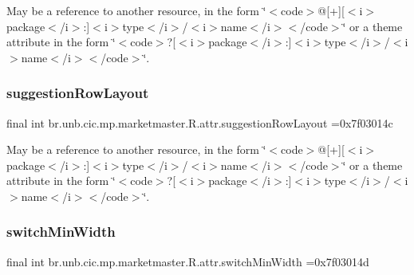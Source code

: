 May be a reference to another resource, in the form \char`\"{}$<$code$>$@\mbox{[}+\mbox{]}\mbox{[}$<$i$>$package$<$/i$>$\+:\mbox{]}$<$i$>$type$<$/i$>$/$<$i$>$name$<$/i$>$$<$/code$>$\char`\"{} or a theme attribute in the form \char`\"{}$<$code$>$?\mbox{[}$<$i$>$package$<$/i$>$\+:\mbox{]}$<$i$>$type$<$/i$>$/$<$i$>$name$<$/i$>$$<$/code$>$\char`\"{}. \mbox{\label{classbr_1_1unb_1_1cic_1_1mp_1_1marketmaster_1_1R_1_1attr_ab55cb82d58c03b036697134199cd8334}} 
\subsubsection{\texorpdfstring{suggestion\+Row\+Layout}{suggestionRowLayout}}
{\footnotesize\ttfamily final int br.\+unb.\+cic.\+mp.\+marketmaster.\+R.\+attr.\+suggestion\+Row\+Layout =0x7f03014c\hspace{0.3cm}{\ttfamily [static]}}

May be a reference to another resource, in the form \char`\"{}$<$code$>$@\mbox{[}+\mbox{]}\mbox{[}$<$i$>$package$<$/i$>$\+:\mbox{]}$<$i$>$type$<$/i$>$/$<$i$>$name$<$/i$>$$<$/code$>$\char`\"{} or a theme attribute in the form \char`\"{}$<$code$>$?\mbox{[}$<$i$>$package$<$/i$>$\+:\mbox{]}$<$i$>$type$<$/i$>$/$<$i$>$name$<$/i$>$$<$/code$>$\char`\"{}. \mbox{\label{classbr_1_1unb_1_1cic_1_1mp_1_1marketmaster_1_1R_1_1attr_a6b9bcfa4cbafa32cc24ace22810b7ca0}} 
\subsubsection{\texorpdfstring{switch\+Min\+Width}{switchMinWidth}}
{\footnotesize\ttfamily final int br.\+unb.\+cic.\+mp.\+marketmaster.\+R.\+attr.\+switch\+Min\+Width =0x7f03014d\hspace{0.3cm}{\ttfamily [static]}}

